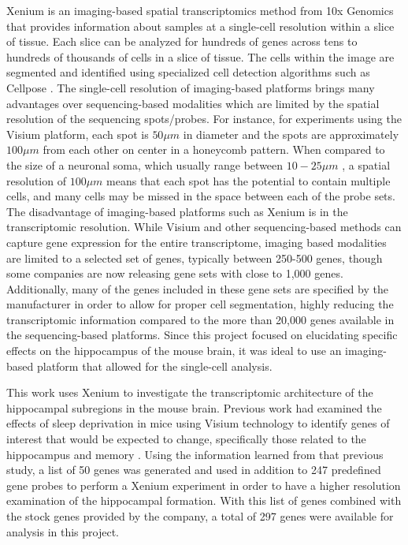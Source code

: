 \documentclass{article}
\begin{document}
Xenium is an imaging-based spatial transcriptomics method from 10x Genomics that provides information about samples at a single-cell resolution within a slice of tissue. Each slice can be analyzed for hundreds of genes across tens to hundreds of thousands of cells in a slice of tissue. The cells within the image are segmented and identified using specialized cell detection algorithms such as Cellpose \cite{Cellpose}. The single-cell resolution of imaging-based platforms brings many advantages over sequencing-based modalities which are limited by the spatial resolution of the sequencing spots/probes. For instance, for experiments using the Visium platform, each spot is $50\mu m$ in diameter and the spots are approximately $100\mu m$ from each other on center in a honeycomb pattern. When compared to the size of a neuronal soma, which usually range between $10-25\mu m$ \cite{dendrites}, a spatial resolution of $100\mu m$ means that each spot has the potential to contain multiple cells, and many cells may be missed in the space between each of the probe sets. The disadvantage of imaging-based platforms such as Xenium is in the transcriptomic resolution. While Visium and other sequencing-based methods can capture gene expression for the entire transcriptome, imaging based modalities are limited to a selected set  of genes, typically between 250-500 genes, though some companies are now releasing gene sets with close to 1,000 genes. Additionally, many of the genes included in these gene sets are specified by the manufacturer in order to allow for proper cell segmentation, highly reducing the transcriptomic information compared to the more than 20,000 genes available in the sequencing-based platforms. Since this project focused on elucidating specific effects on the hippocampus of the mouse brain, it was ideal to use an imaging-based platform that allowed for the single-cell analysis. 

This work uses Xenium to investigate the transcriptomic architecture of the hippocampal subregions in the mouse brain. Previous work had examined the effects of sleep deprivation in mice using Visium technology to identify genes of interest that would be expected to change, specifically those related to the hippocampus and memory \cite{visiumSD}. Using the information learned from that previous study, a list of 50 genes was generated and used in addition to 247 predefined gene probes to perform a Xenium experiment in order to have a higher resolution examination of the hippocampal formation. With this list of genes combined with the stock genes provided by the company, a total of 297 genes were available for analysis in this project. 
\end{document}
